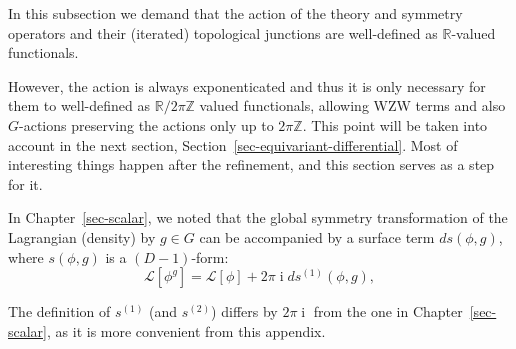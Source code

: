\documentclass[11pt,toc=bibliography]{scrbook}
\DeclareMathOperator{\imunit}{i}
\numberwithin{equation}{section}
\DeclareMathOperator{\imunit}{i}
\begin{document}
\begin{tcolorbox}[enhanced jigsaw, opacityback=0, opacitybacktitle=0.6, leftrule=.75mm, arc=.35mm, coltitle=black, breakable, colframe=quarto-callout-warning-color-frame, titlerule=0mm, colback=white, bottomrule=.15mm, left=2mm, colbacktitle=quarto-callout-warning-color!10!white, toptitle=1mm, bottomtitle=1mm, title=\textcolor{quarto-callout-warning-color}{\faExclamationTriangle}\hspace{0.5em}{Warning \ref*{wrn-differential} }, rightrule=.15mm, toprule=.15mm]


In this subsection we demand that the action of the theory and symmetry
operators and their (iterated) topological junctions are well-defined as
\(\mathbb{R}\)-valued functionals.

However, the action is always exponenticated and thus it is only
necessary for them to well-defined as \(\mathbb{R}/2\pi \mathbb{Z}\)
valued functionals, allowing WZW terms and also \(G\)-actions preserving
the actions only up to \(2\pi \mathbb{Z}\). This point will be taken
into account in the next section,
Section~\ref{sec-equivariant-differential}. Most of interesting things
happen after the refinement, and this section serves as a step for it.

\end{tcolorbox}

In Chapter~\ref{sec-scalar}, we noted that the global symmetry
transformation of the Lagrangian (density) by \(g \in G\) can be
accompanied by a surface term \(ds(\phi,g)\), where \(s(\phi,g)\) is a
\((D-1)\)-form: \[
\mathcal{L}[\phi^g] = \mathcal{L}[\phi] + 2\pi\imunit ds^{(1)}(\phi,g),
\]

\begin{tcolorbox}[enhanced jigsaw, opacityback=0, opacitybacktitle=0.6, leftrule=.75mm, arc=.35mm, coltitle=black, breakable, colframe=quarto-callout-warning-color-frame, titlerule=0mm, colback=white, bottomrule=.15mm, left=2mm, colbacktitle=quarto-callout-warning-color!10!white, toptitle=1mm, bottomtitle=1mm, title=\textcolor{quarto-callout-warning-color}{\faExclamationTriangle}\hspace{0.5em}{Warning}, rightrule=.15mm, toprule=.15mm]

The definition of \(s^{(1)}\) (and \(s^{(2)}\)) differs by
\(2\pi\imunit\) from the one in Chapter~\ref{sec-scalar}, as it is more
convenient from this appendix.

\end{tcolorbox}
\end{document}
